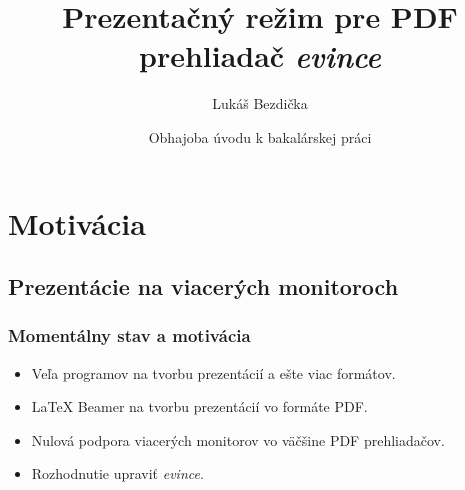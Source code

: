 \documentclass{beamer}
\title[Prezentačný mód evince] %
{Prezentačný režim pre PDF prehliadač \emph{evince}}
\author[Bezdička L.] %
{Lukáš Bezdička\inst{1}}
\institute[FI MUNI] %
{
  \inst{1}%
  Fakulta Informatiky\\
  Masarykova Univerzita
}
\date[Jar 2011] %
{Obhajoba úvodu k bakalárskej práci}
\begin{document}
\begin{frame}
  \titlepage
\end{frame}






\section{Motivácia}

\subsection{Prezentácie na viacerých monitoroch}

\begin{frame}
  \frametitle{Momentálny stav a motivácia}

  \begin{itemize}
  \item
    Veľa programov na tvorbu prezentácií a ešte viac formátov. 
    \pause
  \item
    LaTeX Beamer na tvorbu prezentácií vo formáte PDF. 
    \pause
  \item
    Nulová podpora viacerých monitorov vo väčšine PDF prehliadačov. 
    \pause
  \item
    Rozhodnutie upraviť \emph{evince}.
  \end{itemize}
\end{frame}
\end{document}
